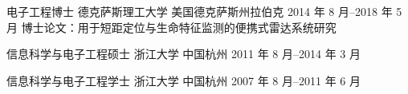 

\begin{cventries}

    \cventry
        {电子工程博士}
        {德克萨斯理工大学}
        {美国德克萨斯州拉伯克}
        {2014 年 8 月--2018 年 5 月}
        {
            {\cvdescfont 博士论文：用于短距定位与生命特征监测的便携式雷达系统研究}
        }

    \cventry
        {信息科学与电子工程硕士}
        {浙江大学}
        {中国杭州}
        {2011 年 8 月--2014 年 3 月}
        {}

    \cventry
        {信息科学与电子工程学士}
        {浙江大学}
        {中国杭州}
        {2007 年 8 月--2011 年 6 月}
        {}

\end{cventries}
